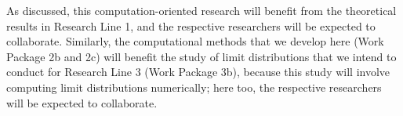 \documentclass[11pt,dvipsnames,usenames,a4paper]{article}
\begin{document}
%
%
% 
% 
%

As discussed, this computation-oriented research will benefit from the theoretical results in Research Line 1, and the respective researchers will be expected to collaborate. Similarly, the computational methods that we develop here (Work Package 2b and 2c) will benefit the study of limit distributions that we intend to conduct for Research Line 3 (Work Package 3b), because this study will involve computing limit distributions numerically; here too, the respective researchers will be expected to collaborate.
\end{document}
